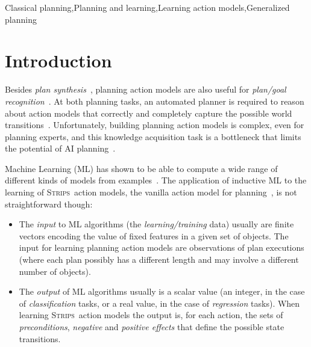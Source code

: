 \documentclass[3p,times]{elsarticle}
\newcommand{\strips}{\textsc{Strips}}     %
\begin{document}
\begin{frontmatter}
\begin{keyword}
Classical planning\sep Planning and learning\sep Learning action models\sep Generalized planning

\end{keyword}

\end{frontmatter}






\section{Introduction}
\label{sec:Section1}
Besides {\em plan synthesis}~\cite{ghallab2004automated}, planning action models are also useful for {\em plan/goal recognition}~\cite{ramirez2012plan}. At both planning tasks, an automated planner is required to reason about action models that correctly and completely capture the possible world transitions~\cite{geffner:book:2013}. Unfortunately, building planning action models is complex, even for planning experts, and this knowledge acquisition task is a bottleneck that limits the potential of AI planning~\cite{kambhampati:modellite:AAAI2007}.

Machine Learning (ML) has shown to be able to compute a wide range of different kinds of models from examples~\cite{michalski2013machine}. The application of inductive ML to the learning of \strips\ action models, the vanilla action model for planning~\cite{fikes1971strips}, is not straightforward though:
\begin{itemize}
\item The {\em input} to ML algorithms (the {\em learning/training} data) usually are finite vectors encoding the value of fixed features in a given set of objects. The input for learning planning action models are observations of plan executions (where each plan possibly has a different length and may involve a different number of objects).
\item The {\em output} of ML algorithms usually is a scalar value (an integer, in the case of {\em classification} tasks, or a real value, in the case of {\em regression} tasks). When learning \strips\ action models the output is, for each action, the sets of {\em preconditions}, {\em negative} and {\em positive effects} that define the possible state transitions.
\end{itemize}
\end{document}
